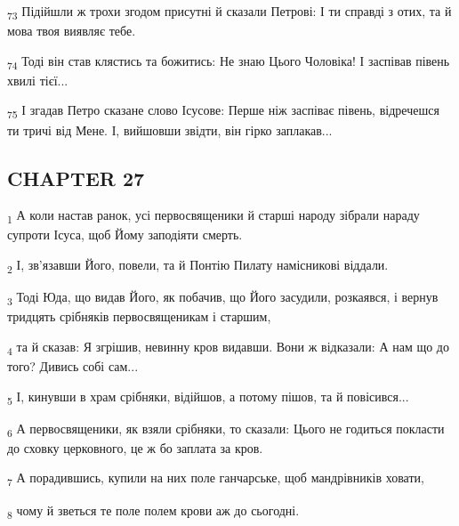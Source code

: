 \begin{tcolorbox}
\textsubscript{73} Підійшли ж трохи згодом присутні й сказали Петрові: І ти справді з отих, та й мова твоя виявляє тебе.
\end{tcolorbox}
\begin{tcolorbox}
\textsubscript{74} Тоді він став клястись та божитись: Не знаю Цього Чоловіка! І заспівав півень хвилі тієї...
\end{tcolorbox}
\begin{tcolorbox}
\textsubscript{75} І згадав Петро сказане слово Ісусове: Перше ніж заспіває півень, відречешся ти тричі від Мене. І, вийшовши звідти, він гірко заплакав...
\end{tcolorbox}
\subsection{CHAPTER 27}
\begin{tcolorbox}
\textsubscript{1} А коли настав ранок, усі первосвященики й старші народу зібрали нараду супроти Ісуса, щоб Йому заподіяти смерть.
\end{tcolorbox}
\begin{tcolorbox}
\textsubscript{2} І, зв'язавши Його, повели, та й Понтію Пилату намісникові віддали.
\end{tcolorbox}
\begin{tcolorbox}
\textsubscript{3} Тоді Юда, що видав Його, як побачив, що Його засудили, розкаявся, і вернув тридцять срібняків первосвященикам і старшим,
\end{tcolorbox}
\begin{tcolorbox}
\textsubscript{4} та й сказав: Я згрішив, невинну кров видавши. Вони ж відказали: А нам що до того? Дивись собі сам...
\end{tcolorbox}
\begin{tcolorbox}
\textsubscript{5} І, кинувши в храм срібняки, відійшов, а потому пішов, та й повісився...
\end{tcolorbox}
\begin{tcolorbox}
\textsubscript{6} А первосвященики, як взяли срібняки, то сказали: Цього не годиться покласти до сховку церковного, це ж бо заплата за кров.
\end{tcolorbox}
\begin{tcolorbox}
\textsubscript{7} А порадившись, купили на них поле ганчарське, щоб мандрівників ховати,
\end{tcolorbox}
\begin{tcolorbox}
\textsubscript{8} чому й зветься те поле полем крови аж до сьогодні.
\end{tcolorbox}
